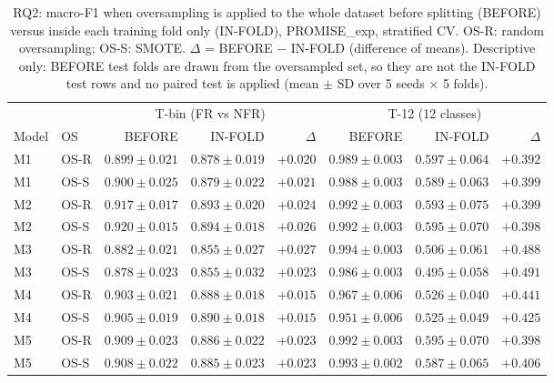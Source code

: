 \begin{table}[t]
\centering
\caption{RQ2: macro-F1 when oversampling is applied to the whole dataset before splitting (BEFORE) versus inside each training fold only (IN-FOLD), PROMISE\_exp, stratified CV. OS-R: random oversampling; OS-S: SMOTE. $\Delta$ = BEFORE $-$ IN-FOLD (difference of means). Descriptive only: BEFORE test folds are drawn from the oversampled set, so they are not the IN-FOLD test rows and no paired test is applied (mean $\pm$ SD over 5 seeds $\times$ 5 folds).}
\label{tab:rq2}
\small
\setlength{\tabcolsep}{4pt}
\begin{tabular}{llrrrrrr}
\toprule
& & \multicolumn{3}{c}{T-bin (FR vs NFR)} & \multicolumn{3}{c}{T-12 (12 classes)} \\
\cmidrule(lr){3-5}\cmidrule(lr){6-8}
Model & OS & BEFORE & IN-FOLD & $\Delta$ & BEFORE & IN-FOLD & $\Delta$ \\
\midrule
M1 & OS-R & $0.899 \pm 0.021$ & $0.878 \pm 0.019$ & $+0.020$ & $0.989 \pm 0.003$ & $0.597 \pm 0.064$ & $+0.392$ \\
M1 & OS-S & $0.900 \pm 0.025$ & $0.879 \pm 0.022$ & $+0.021$ & $0.988 \pm 0.003$ & $0.589 \pm 0.063$ & $+0.399$ \\
M2 & OS-R & $0.917 \pm 0.017$ & $0.893 \pm 0.020$ & $+0.024$ & $0.992 \pm 0.003$ & $0.593 \pm 0.075$ & $+0.399$ \\
M2 & OS-S & $0.920 \pm 0.015$ & $0.894 \pm 0.018$ & $+0.026$ & $0.992 \pm 0.003$ & $0.595 \pm 0.070$ & $+0.398$ \\
M3 & OS-R & $0.882 \pm 0.021$ & $0.855 \pm 0.027$ & $+0.027$ & $0.994 \pm 0.003$ & $0.506 \pm 0.061$ & $+0.488$ \\
M3 & OS-S & $0.878 \pm 0.023$ & $0.855 \pm 0.032$ & $+0.023$ & $0.986 \pm 0.003$ & $0.495 \pm 0.058$ & $+0.491$ \\
M4 & OS-R & $0.903 \pm 0.021$ & $0.888 \pm 0.018$ & $+0.015$ & $0.967 \pm 0.006$ & $0.526 \pm 0.040$ & $+0.441$ \\
M4 & OS-S & $0.905 \pm 0.019$ & $0.890 \pm 0.018$ & $+0.015$ & $0.951 \pm 0.006$ & $0.525 \pm 0.049$ & $+0.425$ \\
M5 & OS-R & $0.909 \pm 0.023$ & $0.886 \pm 0.022$ & $+0.023$ & $0.992 \pm 0.003$ & $0.595 \pm 0.070$ & $+0.398$ \\
M5 & OS-S & $0.908 \pm 0.022$ & $0.885 \pm 0.023$ & $+0.023$ & $0.993 \pm 0.002$ & $0.587 \pm 0.065$ & $+0.406$ \\
\bottomrule
\end{tabular}
\end{table}
